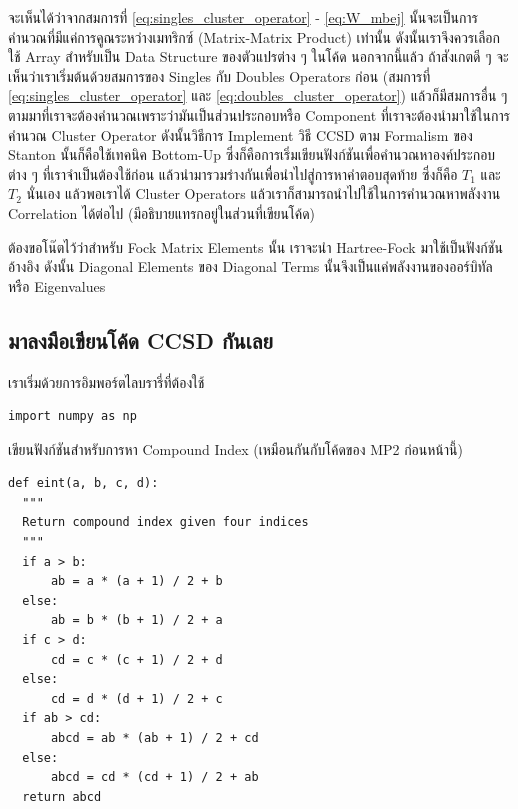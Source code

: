 จะเห็นได้ว่าจากสมการที่ \eqref{eq:singles_cluster_operator} - \eqref{eq:W_mbej} นั้นจะเป็นการคำนวณที่มีแค่การคูณระหว่างเมทริกซ์
(Matrix-Matrix Product) เท่านั้น ดังนั้นเราจึงควรเลือกใช้ Array สำหรับเป็น Data Structure ของตัวแปรต่าง ๆ ในโค้ด นอกจากนี้แล้ว%
ถ้าสังเกตดี ๆ จะเห็นว่าเราเริ่มต้นด้วยสมการของ Singles กับ Doubles Operators ก่อน (สมการที่ \eqref{eq:singles_cluster_operator}
และ \eqref{eq:doubles_cluster_operator}) แล้วก็มีสมการอื่น ๆ ตามมาที่เราจะต้องคำนวณเพราะว่ามันเป็นส่วนประกอบหรือ Component
ที่เราจะต้องนำมาใช้ในการคำนวณ Cluster Operator ดังนั้นวิธีการ Implement วิธี CCSD ตาม Formalism ของ Stanton นั้นก็คือใช้เทคนิค
Bottom-Up ซึ่งก็คือการเริ่มเขียนฟังก์ชันเพื่อคำนวณหาองค์ประกอบต่าง ๆ ที่เราจำเป็นต้องใช้ก่อน แล้วนำมารวมร่างกันเพื่อนำไปสู่การหาคำตอบสุดท้าย
ซึ่งก็คือ $T_{1}$ และ $T_{2}$ นั่นเอง แล้วพอเราได้ Cluster Operators แล้วเราก็สามารถนำไปใช้ในการคำนวณหาพลังงาน Correlation
ได้ต่อไป (มีอธิบายแทรกอยู่ในส่วนที่เขียนโค้ด)

ต้องขอโน๊ตไว้ว่าสำหรับ Fock Matrix Elements นั้น เราจะนำ Hartree-Fock มาใช้เป็นฟังก์ชันอ้างอิง ดังนั้น Diagonal Elements ของ
Diagonal Terms นั้นจึงเป็นแค่พลังงานของออร์บิทัลหรือ Eigenvalues

\subsection{มาลงมือเขียนโค้ด CCSD กันเลย}

\vspace{5pt}

\noindent เราเริ่มด้วยการอิมพอร์ตไลบรารี่ที่ต้องใช้

\vspace{5pt}

\begin{lstlisting}[style=MyPython]
import numpy as np
\end{lstlisting}

\vspace{5pt}

\noindent เขียนฟังก์ชันสำหรับการหา Compound Index (เหมือนกันกับโค้ดของ MP2 ก่อนหน้านี้)

\vspace{5pt}

\begin{lstlisting}[style=MyPython]
def eint(a, b, c, d):
  """
  Return compound index given four indices
  """
  if a > b:
      ab = a * (a + 1) / 2 + b
  else:
      ab = b * (b + 1) / 2 + a
  if c > d:
      cd = c * (c + 1) / 2 + d
  else:
      cd = d * (d + 1) / 2 + c
  if ab > cd:
      abcd = ab * (ab + 1) / 2 + cd
  else:
      abcd = cd * (cd + 1) / 2 + ab
  return abcd
\end{lstlisting}

